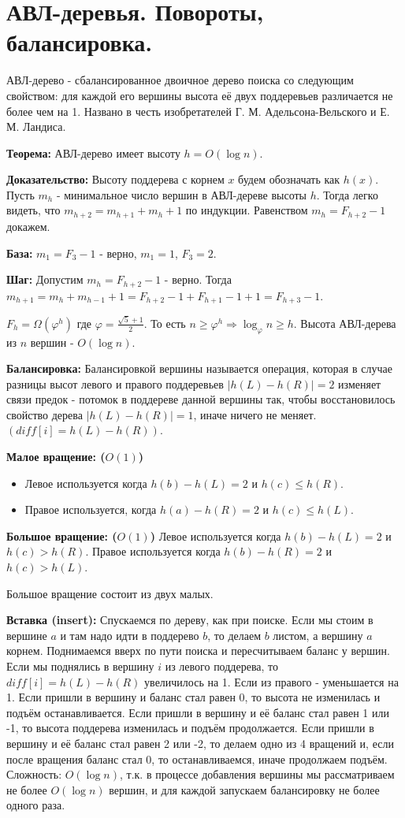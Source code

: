 \section{АВЛ-деревья. Повороты, балансировка.}


АВЛ-дерево - сбалансированное двоичное дерево поиска со следующим свойством: для каждой его вершины высота её двух поддеревьев различается не более чем на 1.
Названо в честь изобретателей  Г. М. Адельсона-Вельского и Е. М. Ландиса.

\textbf{Теорема:} АВЛ-дерево имеет высоту $h=O(\log n)$.

\textbf{Доказательство:} Высоту поддерева с корнем $x$ будем обозначать как $h(x)$.
Пусть $m_h$ - минимальное число вершин в АВЛ-дереве высоты $h$. Тогда легко видеть, что $m_{h+2}=m_{h+1}+m_h+1$ по индукции.
Равенством $m_h=F_{h+2}-1$ докажем.

\textbf{База:} $m_1=F_3-1$ - верно, $m_1=1$, $F_3=2$.

\textbf{Шаг:} Допустим $m_h=F_{h+2}-1$ - верно.
Тогда $m_{h+1}=m_h+m_{h-1}+1=F_{h+2}-1+F_{h+1}-1+1 = F_{h+3}-1$.

$F_h=\Omega(\varphi^h)$ где $\varphi=\frac{\sqrt{5}+1}{2}$.
То есть $n \ge \varphi^h \Rightarrow \log_{\varphi} n \ge h$.
Высота АВЛ-дерева из $n$ вершин - $O(\log n)$.

\textbf{Балансировка:}
Балансировкой вершины называется операция, которая в случае разницы высот левого и правого поддеревьев $|h(L)-h(R)|=2$ изменяет связи предок - потомок в поддереве данной вершины так, чтобы восстановилось свойство дерева $|h(L)-h(R)|=1$, иначе ничего не меняет.
$(diff[i]=h(L)-h(R))$.

\textbf{Малое вращение: ($O(1)$)}
\begin{itemize}
	\item Левое используется когда $h(b)-h(L)=2$ и $h(c) \le h(R)$.
	\item Правое используется, когда $h(a)-h(R)=2$ и $h(c) \le h(L)$.
\end{itemize}



\textbf{Большое вращение: ($O(1)$)}
Левое используется когда $h(b)-h(L)=2$ и $h(c)>h(R)$.
Правое используется когда $h(b)-h(R)=2$ и $h(c)>h(L)$.


Большое вращение состоит из двух малых.

\textbf{Вставка (insert):}
Спускаемся по дереву, как при поиске.
Если мы стоим в вершине $a$ и там надо идти в поддерево $b$, то делаем $b$ листом, а вершину $a$ корнем.
Поднимаемся вверх по пути поиска и пересчитываем баланс у вершин.
Если мы поднялись в вершину $i$ из левого поддерева, то $diff[i]=h(L)-h(R)$ увеличилось на 1. Если из правого - уменьшается на 1.
Если пришли в вершину и баланс стал равен 0, то высота не изменилась и подъём останавливается.
Если пришли в вершину и её баланс стал равен 1 или -1, то высота поддерева изменилась и подъём продолжается.
Если пришли в вершину и её баланс стал равен 2 или -2, то делаем одно из 4 вращений и, если после вращения баланс стал 0, то останавливаемся, иначе продолжаем подъём.
Сложность: $O(\log n)$, т.к. в процессе добавления вершины мы рассматриваем не более $O(\log n)$ вершин, и для каждой запускаем балансировку не более одного раза.

